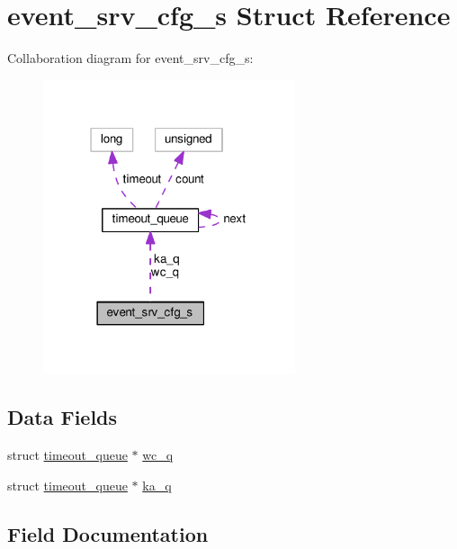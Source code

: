 \hypertarget{structevent__srv__cfg__s}{}\section{event\+\_\+srv\+\_\+cfg\+\_\+s Struct Reference}
\label{structevent__srv__cfg__s}


Collaboration diagram for event\+\_\+srv\+\_\+cfg\+\_\+s\+:
\nopagebreak
\begin{figure}[H]
\begin{center}
\leavevmode
\includegraphics[width=210pt]{structevent__srv__cfg__s__coll__graph}
\end{center}
\end{figure}
\subsection*{Data Fields}
\begin{DoxyCompactItemize}
\item 
struct \hyperlink{structtimeout__queue}{timeout\+\_\+queue} $\ast$ \hyperlink{structevent__srv__cfg__s_afb525a3542e3096651786d1604ab7485}{wc\+\_\+q}
\item 
struct \hyperlink{structtimeout__queue}{timeout\+\_\+queue} $\ast$ \hyperlink{structevent__srv__cfg__s_abe7b6b4207b43e62677afcc285e80676}{ka\+\_\+q}
\end{DoxyCompactItemize}


\subsection{Field Documentation}
